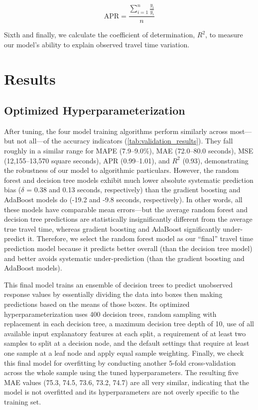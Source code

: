 \documentclass[12pt,letterpaper]{article} %
\begin{document}
\begin{equation}
\label{eq:apr}
\text{APR} = \frac{\sum^{n}_{i=1}\frac{y_i}{\hat{y_i}}}{n}
\end{equation}

Sixth and finally, we calculate the coefficient of determination, $R^2$, to measure our model's ability to explain observed travel time variation.

\section{Results}

\subsection{Optimized Hyperparameterization}

After tuning, the four model training algorithms perform similarly across most---but not all---of the accuracy indicators (\autoref{tab:validation_results}). They fall roughly in a similar range for MAPE (7.9--9.0\%), MAE (72.0--80.0 seconds), MSE (12,155--13,570 square seconds), APR (0.99--1.01), and $R^2$ (0.93), demonstrating the robustness of our model to algorithmic particulars. However, the random forest and decision tree models exhibit much lower absolute systematic prediction bias ($\delta$ = 0.38 and 0.13 seconds, respectively) than the gradient boosting and AdaBoost models do (-19.2 and -9.8 seconds, respectively). In other words, all these models have comparable mean errors---but the average random forest and decision tree predictions are statistically insignificantly different from the average true travel time, whereas gradient boosting and AdaBoost significantly under-predict it. Therefore, we select the random forest model as our \enquote{final} travel time prediction model because it predicts better overall (than the decision tree model) and better avoids systematic under-prediction (than the gradient boosting and AdaBoost models).

This final model trains an ensemble of decision trees to predict unobserved response values by essentially dividing the data into boxes then making predictions based on the means of those boxes. Its optimized hyperparameterization uses 400 decision trees, random sampling with replacement in each decision tree, a maximum decision tree depth of 10, use of all available input explanatory features at each split, a requirement of at least two samples to split at a decision node, and the default settings that require at least one sample at a leaf node and apply equal sample weighting. Finally, we check this final model for overfitting by conducting another 5-fold cross-validation across the whole sample using the tuned hyperparameters. The resulting five MAE values (75.3, 74.5, 73.6, 73.2, 74.7) are all very similar, indicating that the model is not overfitted and its hyperparameters are not overly specific to the training set.
\end{document}
